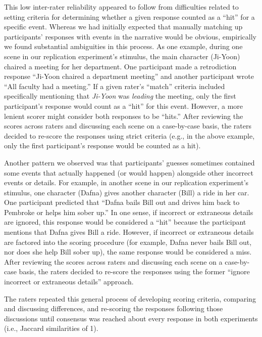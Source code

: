 \documentclass[10pt]{article}
\begin{document}
This low inter-rater reliability appeared to follow from difficulties related to setting criteria for determining whether a given response counted as a ``hit'' for a specific event.  Whereas we had initially expected that manually matching up participants' responses with events in the narrative would be obvious, empirically we found substantial ambiguities in this process. As one example, during one scene in our replication experiment's stimulus, the main character (Ji-Yoon) chaired a meeting for her department. One participant made a retrodiction response ``Ji-Yoon chaired a department meeting'' and another participant wrote ``All faculty had a meeting.'' If a given rater's ``match'' criteria included specifically mentioning that \textit{Ji-Yoon} was \textit{leading} the meeting, only the first participant's response would count as a ``hit'' for this event. However, a more lenient scorer might consider both responses to be ``hits.''  After reviewing the scores across raters and discussing each scene on a case-by-case basis, the raters decided to re-score the responses using strict criteria (e.g., in the above example, only the first participant's response would be counted as a hit).

Another pattern we observed was that participants' guesses sometimes contained some events that actually happened (or would happen) alongside other incorrect events or details.  For example, in another scene in our replication experiment's stimulus, one character (Dafna) gives another character (Bill) a ride in her car.  One participant predicted that ``Dafna bails Bill out and drives him back to Pembroke or helps him sober up.''  In one sense, if incorrect or extraneous details are ignored, this response would be considered a ``hit'' because the participant mentions that Dafna gives Bill a ride.  However, if incorrect or extraneous details are factored into the scoring procedure (for example, Dafna never bails Bill out, nor does she help Bill sober up), the same response would be considered a miss.  After reviewing the scores across raters and discussing each scene on a case-by-case basis, the raters decided to re-score the responses using the former ``ignore incorrect or extraneous details'' approach.

The raters repeated this general process of developing scoring criteria, comparing and discussing differences, and re-scoring the responses following those discussions until consensus was reached about every response in both experiments (i.e., Jaccard similarities of 1).
\end{document}
